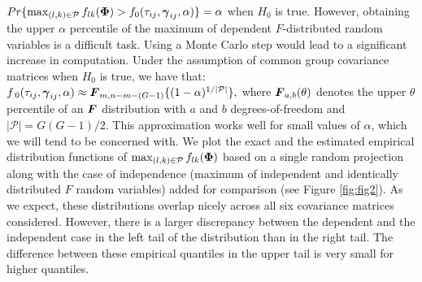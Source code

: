 \documentclass[APA,Times1COL]{WileyNJDv5} %
\newcommand{\uF}       {\mbox{\boldmath$F$}}
\newcommand{\ugamma}            {\mbox{\boldmath$\gamma$}}
\newcommand{\uPhi}              {\mbox{\boldmath$\Phi$}}
\begin{document}
$Pr\{\max_{(l, k)\in\mathcal{P}}f_{lk}(\uPhi) > f_{0}(\tau_{ij},\ugamma_{ij}, \alpha)\} = \alpha$ when $H_{0}$ is true. However, obtaining the upper $\alpha$ percentile of the maximum of dependent $F$-distributed random variables is a difficult task. Using a Monte Carlo step would lead to a significant increase in computation. Under the assumption of common group covariance matrices when $H_0$ is true, we have that: 
$f_{\;0}(\tau_{ij},\ugamma_{ij}, \alpha) \approx \uF_{m, n -m -(G-1)}\{(1 - \alpha)^{1/|\mathcal{P}|}\},$ where $\uF_{a, b}(\theta)$ denotes the upper $\theta$ percentile of an $\uF$ distribution with $a$ and $b$ degrees-of-freedom and $|\mathcal{P}| = G(G-1)/2$. This approximation works well for small values of $\alpha$, which we will tend to be concerned with. We plot the exact and the estimated empirical distribution functions of $\max_{(l, k)\in\mathcal{P}}f_{lk}(\uPhi)$ based on a single random projection along with the case of independence (maximum of independent and identically distributed $F$ random variables) added for comparison (see Figure \ref{fig:fig2}). As we expect, these distributions overlap nicely across all six covariance matrices considered. However, there is a larger discrepancy between the dependent and the independent case in the left tail of the distribution than in the right tail. The difference between these empirical quantiles in the upper tail is very small for higher quantiles.
\end{document}
